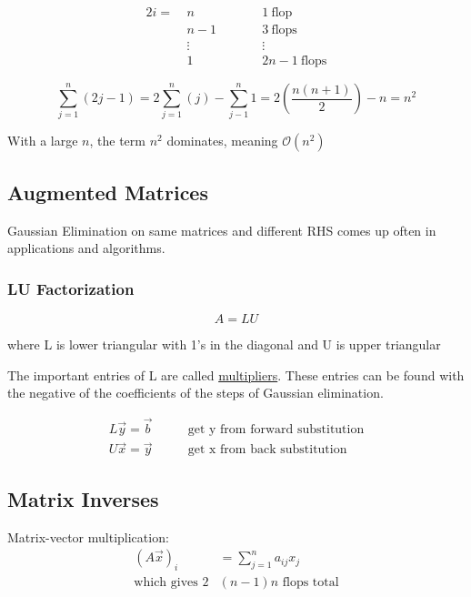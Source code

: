 \documentclass[12pt, letterpaper]{article}
\begin{document}
\begin{alignat*}{2}
    i =\ & n &\qquad& 1\ \text{flop} \\
        & n-1 && 3\ \text{flops} \\
        & \vdots && \vdots \\
        & 1 && 2n-1\ \text{flops}
\end{alignat*}

\[
    \sum^n_{j=1} (2j-1) = 2 \sum^n_{j=1}(j)-\sum^n_{j-1}1 = 2\left(\frac{n(n+1)}{2}\right)-n = n^2
\]
\begin{center}
With a large $n$, the term $n^2$ dominates, meaning $\mathcal{O}(n^2)$
\end{center}


\subsection{Augmented Matrices}

Gaussian Elimination on same matrices and different RHS comes up often in applications and algorithms.

\subsubsection{LU Factorization}
\[ A = LU \]
\begin{center}
where L is lower triangular with 1's in the diagonal and U is upper triangular
\end{center}

\noindent The important entries of L are called \underline{multipliers}. These entries can be found 
with the negative of the coefficients of the steps of Gaussian elimination.

\begin{align*}
    L\vec y = \vec b &\qquad \text{get y from forward substitution} \\
    U\vec x = \vec y &\qquad \text{get x from back substitution}
\end{align*}

\subsection{Matrix Inverses}
\noindent Matrix-vector multiplication:
\begin{align*}
(A\vec x)_i &= \sum_{j=1}^{n} a_{ij}x_j \\
\text{which gives } 2&(n-1)n \text{ flops total}
\end{align*}
\end{document}
